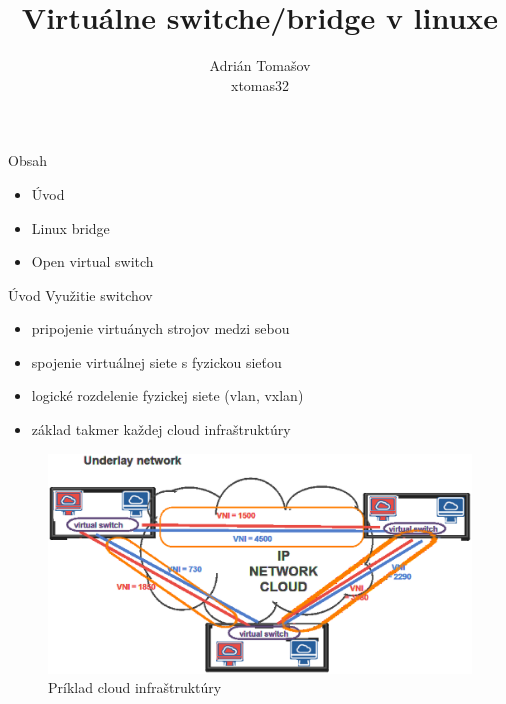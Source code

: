\documentclass{beamer}
\author{Adrián Tomašov \\ xtomas32}
\title{Virtuálne switche/bridge v linuxe}
\begin{document}
	\begin{frame}
		\titlepage
	\end{frame}

	\begin{frame}{Obsah}
		\begin{itemize}
			\item{Úvod}
			\item{Linux bridge}
			\item{Open virtual switch}
		\end{itemize}
	\end{frame}
	
	
	\begin{frame}{Úvod}
		Využitie switchov
		\begin{itemize}
			\item{pripojenie virtuánych strojov medzi sebou}
			\item{spojenie virtuálnej siete s fyzickou sieťou}
			\item{logické rozdelenie fyzickej siete (vlan, vxlan)}
			\item{základ takmer každej cloud infraštruktúry}
		\end{itemize}
		
		\begin{figure}
			\includegraphics[scale=0.2]{Underlay-final-1.eps}
			\caption{Príklad cloud infraštruktúry}
		\end{figure}
	\end{frame}
\end{document}
